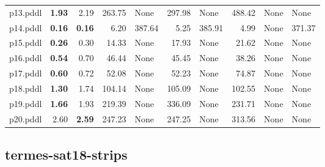 \documentclass{article}
\begin{document}
\begin{tabular}{@{}lrrrrrrrrr@{}}
p13.pddl & \textbf{1.93} & 2.19 & 263.75 & \multicolumn{1}{|l|}{None} & 297.98 & \multicolumn{1}{|l|}{None} & 488.42 & \multicolumn{1}{|l|}{None} & \multicolumn{1}{|l|}{None} \\
p14.pddl & \textbf{0.16} & \textbf{0.16} & 6.20 & 387.64 & 5.25 & 385.91 & 4.99 & \multicolumn{1}{|l|}{None} & 371.37 \\
p15.pddl & \textbf{0.26} & 0.30 & 14.33 & \multicolumn{1}{|l|}{None} & 17.93 & \multicolumn{1}{|l|}{None} & 21.62 & \multicolumn{1}{|l|}{None} & \multicolumn{1}{|l|}{None} \\
p16.pddl & \textbf{0.54} & 0.70 & 46.44 & \multicolumn{1}{|l|}{None} & 45.45 & \multicolumn{1}{|l|}{None} & 38.26 & \multicolumn{1}{|l|}{None} & \multicolumn{1}{|l|}{None} \\
p17.pddl & \textbf{0.60} & 0.72 & 52.08 & \multicolumn{1}{|l|}{None} & 52.23 & \multicolumn{1}{|l|}{None} & 74.87 & \multicolumn{1}{|l|}{None} & \multicolumn{1}{|l|}{None} \\
p18.pddl & \textbf{1.30} & 1.74 & 104.14 & \multicolumn{1}{|l|}{None} & 105.09 & \multicolumn{1}{|l|}{None} & 102.55 & \multicolumn{1}{|l|}{None} & \multicolumn{1}{|l|}{None} \\
p19.pddl & \textbf{1.66} & 1.93 & 219.39 & \multicolumn{1}{|l|}{None} & 336.09 & \multicolumn{1}{|l|}{None} & 231.71 & \multicolumn{1}{|l|}{None} & \multicolumn{1}{|l|}{None} \\
p20.pddl & 2.60 & \textbf{2.59} & 247.23 & \multicolumn{1}{|l|}{None} & 247.25 & \multicolumn{1}{|l|}{None} & 313.56 & \multicolumn{1}{|l|}{None} & \multicolumn{1}{|l|}{None} \\
\end{tabular}

\hypertarget{search_start_time-termes-sat18-strips}{}
\subsection*{termes-sat18-strips}
\end{document}
